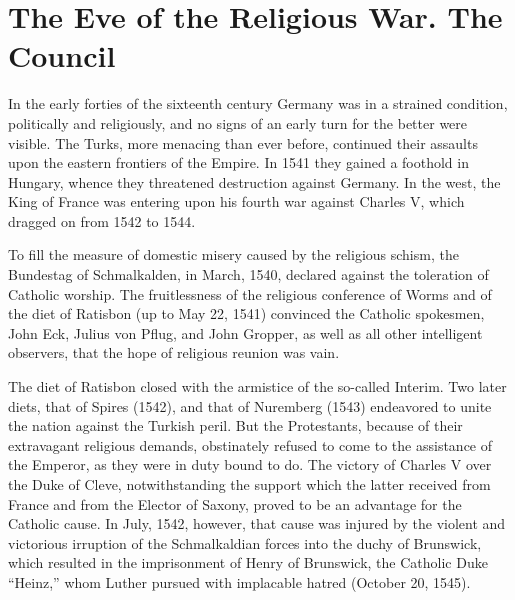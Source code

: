 \section{The Eve of the Religious War. The Council}

In the early forties of the sixteenth century Germany was in a
strained condition, politically and religiously, and no signs of an early
turn for the better were visible. The Turks, more menacing than ever
before, continued their assaults upon the eastern frontiers of the Empire.
In 1541 they gained a foothold in Hungary, whence they threatened
destruction against Germany. In the west, the King of France was
entering upon his fourth war against Charles V, which dragged on
from 1542 to 1544.

To fill the measure of domestic misery caused by the religious
schism, the Bundestag of Schmalkalden, in March, 1540, declared
against the toleration of Catholic worship. The fruitlessness of the
religious conference of Worms and of the diet of Ratisbon (up to
May 22, 1541) convinced the Catholic spokesmen, John Eck, Julius
von Pflug, and John Gropper, as well as all other intelligent observers,
that the hope of religious reunion was vain.

The diet of Ratisbon closed with the armistice of the so-called
Interim. Two later diets, that of Spires (1542), and that of Nuremberg
(1543) endeavored to unite the nation against the Turkish peril.
But the Protestants, because of their extravagant religious demands,
obstinately refused to come to the assistance of the Emperor, as they
were in duty bound to do. The victory of Charles V over the Duke of
Cleve, notwithstanding the support which the latter received from
France and from the Elector of Saxony, proved to be an advantage for
the Catholic cause. In July, 1542, however, that cause was injured by
the violent and victorious irruption of the Schmalkaldian forces into
the duchy of Brunswick, which resulted in the imprisonment of Henry
of Brunswick, the Catholic Duke “Heinz,” whom Luther pursued
with implacable hatred (October 20, 1545).

